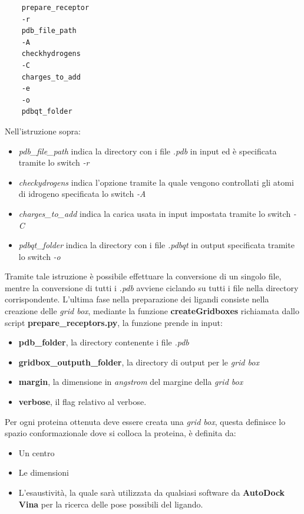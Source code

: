 \begin{verbatim}
    prepare_receptor 
    -r 
    pdb_file_path 
    -A 
    checkhydrogens 
    -C 
    charges_to_add 
    -e 
    -o 
    pdbqt_folder
\end{verbatim}

Nell'istruzione sopra:

\begin{itemize}
    \item \textit{pdb\_file\_path} indica la directory con i file \textit{.pdb} in input ed è specificata tramite lo switch \textit{-r}
    \item \textit{checkydrogens} indica l'opzione tramite la quale vengono controllati gli atomi di idrogeno specificata lo switch \textit{-A}    
    \item \textit{charges\_to\_add} indica la carica usata in input impostata tramite lo switch \textit{-C} 
    \item \textit{pdbqt\_folder} indica la directory con i file \textit{.pdbqt} in output specificata tramite lo switch \textit{-o}
\end{itemize}

Tramite tale istruzione è possibile effettuare la conversione di un singolo file, mentre la conversione di tutti i \textit{.pdb} avviene ciclando su tutti i file nella directory corrispondente.\newline
L'ultima fase nella preparazione dei ligandi consiste nella creazione delle \textit{grid box}, mediante la funzione \textbf{createGridboxes} richiamata dallo script \textbf{prepare\_receptors.py}, la funzione prende in input:

\begin{itemize}
    \item \textbf{pdb\_folder}, la directory contenente i file \textit{.pdb} 
    \item \textbf{gridbox\_outputh\_folder}, la directory di output per le \textit{grid box}
    \item \textbf{margin}, la dimensione in \textit{angstrom} del margine della \textit{grid box}
    \item \textbf{verbose}, il flag relativo al verbose.
\end{itemize}

Per ogni proteina ottenuta deve essere creata una \textit{grid box}, questa definisce lo spazio conformazionale dove si colloca la proteina, è definita da:

\begin{itemize}
    \item Un centro
    \item Le dimensioni
    \item L'esaustività, la quale sarà utilizzata da qualsiasi software da \textbf{AutoDock Vina} per la ricerca delle pose possibili del ligando.
\end{itemize}

